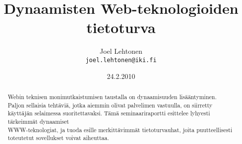 \documentclass[a4paper,12pt]{article}
\title{Dynaamisten Web-teknologioiden tietoturva}
\author{Joel Lehtonen\\ \texttt{joel.lehtonen@iki.fi}}
\date{24.2.2010}
\begin{document}
\maketitle

\begin{abstract}
Webin teknisen monimutkaistumisen taustalla on dynaamisuuden
lisääntyminen. Paljon sellaisia tehtäviä, jotka aiemmin olivat
palvelimen vastuulla, on siirretty käyttäjän selaimessa
suoritettavaksi.  Tämä seminaariraportti esittelee lyhyesti tärkeimmät
dynaamiset\\ WWW-teknologiat, ja tuoda esille merkittävimmät
tietoturvauhat, joita puutteellisesti toteutetut sovellukset voivat
aiheuttaa.
\end{abstract}





\end{document}
